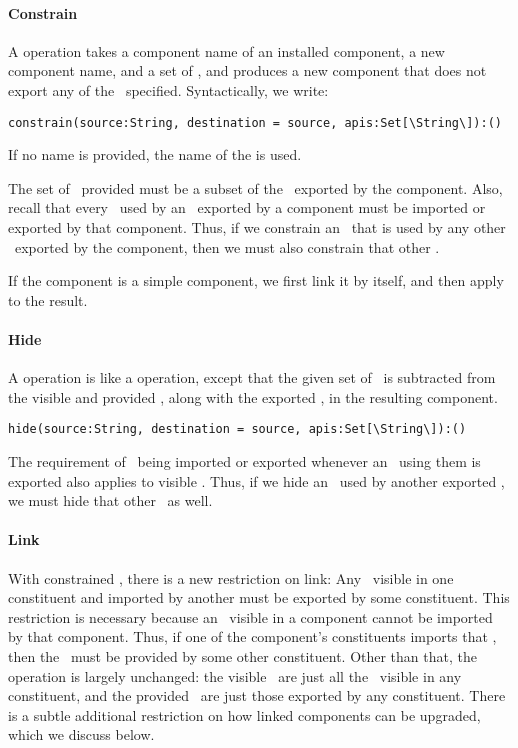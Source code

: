 \paragraph{Constrain}

A  operation takes
a component name of an installed component,
a new component name, and a set of \apisN,
and produces a new component that does not export any of the \apisN\ specified.
Syntactically, we write:

{\small\verb+constrain(source:String, destination = source, apis:Set[\String\]):()+}

If no  name is provided, the name of the 
is used.

The set of \apisN\ provided must be a subset of the \apisN\ exported
by the component.
Also, recall that every \apiN\ used by an \apiN\ exported by a component
must be imported or exported by that component.
Thus, if we constrain an \apiN\ that is used by any other \apiN\ exported
by the component,
then we must also constrain that other \apiN.

If the component is a simple component,
we first link it by itself,
and then apply  to the result.

\paragraph{Hide}

A  operation is like a  operation,
except that the given set of \apisN\ is subtracted from
the visible and provided \apisN, along with the exported \apisN,
in the resulting component.

{\small\verb+hide(source:String, destination = source, apis:Set[\String\]):()+}

The requirement of \apisN\ being imported or exported whenever
an \apiN\ using them is exported
also applies to visible \apisN.
Thus, if we hide an \apiN\ used by another exported \apiN,
we must hide that other \apiN\ as well.

\paragraph{Link}

With constrained \apisN,
there is a new restriction on link:
Any \apiN\ visible in one constituent and imported by another
must be exported by some constituent.
This restriction is necessary
because an \apiN\ visible in a component cannot be imported by that component.
Thus, if one of the component's constituents imports that \apiN,
then the \apiN\ must be provided by some other constituent.
Other than that,
the  operation is largely unchanged:
the visible \apisN\ are just all the \apisN\ visible in any constituent,
and the provided \apisN\ are just those exported by any constituent.
There is a subtle additional restriction
on how linked components can be upgraded,
which we discuss below.

